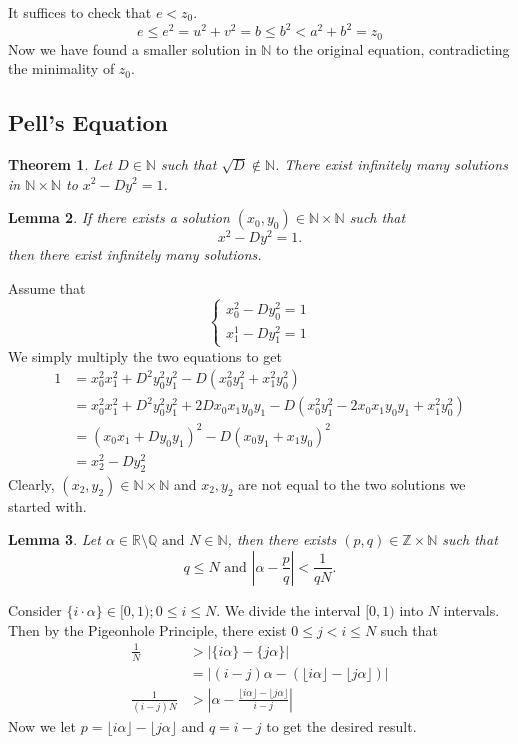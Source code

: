 \documentclass[11pt]{article}
\newtheorem{thm}{Theorem}[section]
\newtheorem{lemma}[thm]{Lemma}
\theoremstyle{definition}
\newcommand{\sm}[0]{\setminus}
\newcommand{\et}[0]{\text{ and }}
\newcommand{\floor}[1]{\lfloor #1 \rfloor}
\newcommand{\abs}[1]{\left\lvert#1\right\rvert} %
\newcommand{\RR}{\mathbb{R}}
\newcommand{\QQ}{\mathbb{Q}}
\newcommand{\ZZ}{\mathbb{Z}}
\newcommand{\NN}{\mathbb{N}}
\begin{document}
	It suffices to check that $e < z_0$. 
	\[
		e \le e^2 = u^2+v^2 = b \le b^2 < a^2+b^2 = z_0
	\]
	Now we have found a smaller solution in $\NN$ to the original equation, contradicting the minimality of $z_0$. 
\qedhere

\subsection{Pell's Equation}

\begin{thm}
	Let $D\in\NN$ such that $\sqrt{D} \not\in \NN$.
	There exist infinitely many solutions in $\NN\times\NN$ to $x^2 - Dy^2 = 1$. 
\end{thm}

\begin{lemma}
	If there exists a solution $(x_0,y_0) \in \NN\times\NN$ such that
	$$ x^2 - Dy^2 = 1 . $$
	then there exist infinitely many solutions.
\end{lemma}
\proof
	Assume that 
	\[
		\begin{cases}
			x_0^2 - Dy_0^2 = 1 \\
			x_1^1 - Dy_1^2 = 1
		\end{cases}
	\]
	We simply multiply the two equations to get 
	\begin{align*}
		1 &= x_0^2x_1^2 + D^2y_0^2y_1^2 - D(x_0^2y_1^2 + x_1^2y_0^2) \\
		  &= x_0^2x_1^2 + D^2y_0^2y_1^2 + 2Dx_0x_1y_0y_1 - D(x_0^2y_1^2 - 2x_0x_1y_0y_1 + x_1^2y_0^2) \\
		  &= (x_0x_1 + Dy_0y_1)^2 - D(x_0y_1 + x_1y_0)^2 \\
		  &= x_2^2 - Dy_2^2
	\end{align*}
	Clearly, $(x_2,y_2)\in\NN\times\NN$ and $x_2, y_2$ are not equal to the two solutions we started with.
\qedhere


\begin{lemma}
	Let $\alpha\in\RR\sm\QQ \et N\in\NN$, then there exists $(p,q)\in\ZZ\times\NN$ such that 
	$$ q \le N  \et  \abs{\alpha-\frac{p}{q}} < \frac1{qN} . $$
\end{lemma}
\proof
	Consider $\{i \cdot \alpha\} \in [0,1); 0\le i \le N$. 
	We divide the interval $[0,1)$ into $N$ intervals. 
	Then by the Pigeonhole Principle, there exist $0 \le j < i \le N$ such that 
	\begin{align*} 
		\frac1N &> \abs{\{i\alpha\} - \{j\alpha\}} \\
		&= \abs{ (i-j)\alpha - (\floor{i\alpha} - \floor{j\alpha}) } \\
		\frac{1}{(i-j)N} &> \abs{ \alpha - \frac{\floor{i\alpha} - \floor{j\alpha}}{i-j} }
	\end{align*}
	Now we let $p = \floor{i\alpha} - \floor{j\alpha}$ and $q = i-j$ to get the desired result. 
\qedhere
\end{document}
